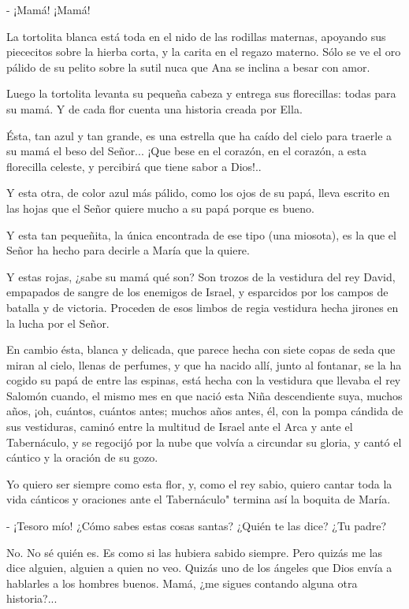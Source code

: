 \documentclass[12pt]{book} %
\begin{document}
- ¡Mamá! ¡Mamá! 

La tortolita blanca está toda en el nido de las rodillas maternas, apoyando sus piececitos sobre la hierba corta, y la carita en el regazo materno. Sólo se ve el oro pálido de su pelito sobre la sutil nuca que Ana se inclina a besar con amor. 

Luego la tortolita levanta su pequeña cabeza y entrega sus florecillas: todas para su mamá. Y de cada flor cuenta una historia creada por Ella. 

Ésta, tan azul y tan grande, es una estrella que ha caído del cielo para traerle a su mamá el beso del Señor... ¡Que bese en el corazón, en el corazón, a esta florecilla celeste, y percibirá que tiene sabor a Dios!.. 

Y esta otra, de color azul más pálido, como los ojos de su papá, lleva escrito en las hojas que el Señor quiere mucho a su papá porque es bueno. 

Y esta tan pequeñita, la única encontrada de ese tipo (una miosota), es la que el Señor ha hecho para decirle a María que la quiere. 

Y estas rojas, ¿sabe su mamá qué son? Son trozos de la vestidura del rey David, empapados de sangre de los enemigos de Israel, y esparcidos por los campos de batalla y de victoria. Proceden de esos limbos de regia vestidura hecha jirones en la lucha por el Señor. 

En cambio ésta, blanca y delicada, que parece hecha con siete copas de seda que miran al cielo, llenas de perfumes, y que ha nacido allí, junto al fontanar, se la ha cogido su papá de entre las espinas, está hecha con la vestidura que llevaba el rey Salomón cuando, el mismo mes en que nació esta Niña descendiente suya, muchos años, ¡oh, cuántos, cuántos antes; muchos años antes, él, con la pompa cándida de sus vestiduras, caminó entre la multitud de Israel ante el Arca y ante el Tabernáculo, y se regocijó por la nube que volvía a circundar su gloria, y cantó el cántico y la oración de su gozo. 

Yo quiero ser siempre como esta flor, y, como el rey sabio, quiero cantar toda la vida cánticos y oraciones ante el Tabernáculo" termina así la boquita de María. 

- ¡Tesoro mío! ¿Cómo sabes estas cosas santas? ¿Quién te las dice? ¿Tu padre? 

No. No sé quién es. Es como si las hubiera sabido siempre. Pero quizás me las dice alguien, alguien a quien no veo. Quizás uno de los ángeles que Dios envía a hablarles a los hombres buenos. Mamá, ¿me sigues contando alguna otra historia?... 
\end{document}
